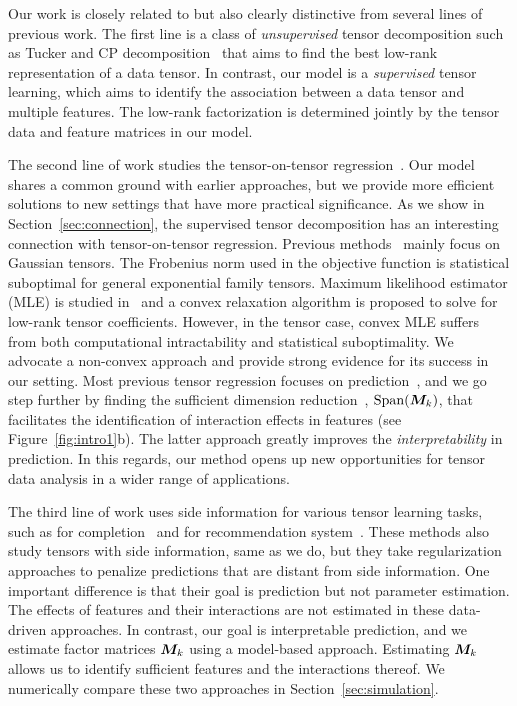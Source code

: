\documentclass[12pt]{article}
\theoremstyle{definition}
\theoremstyle{definition}
\begin{document}
Our work is closely related to but also clearly distinctive from several lines of previous work. The first line is a class of \textit{unsupervised} tensor decomposition such as Tucker and CP decomposition~\citep{de2000multilinear, kolda2009tensor, hong2020generalized} that aims to find the best low-rank representation of a data tensor. In contrast, our model is a \textit{supervised} tensor learning, which aims to identify the association between a data tensor and multiple features. The low-rank factorization is determined jointly by the tensor data and feature matrices in our model.

The second line of work studies the tensor-on-tensor regression~\citep{raskutti2019convex, lock2018tensor, gahrooei2020multiple}. Our model shares a common ground with earlier approaches, but we provide more efficient solutions to new settings that have more practical significance. As we show in Section~\ref{sec:connection}, the supervised tensor decomposition has an interesting connection with tensor-on-tensor regression. Previous methods~\citep{gahrooei2020multiple,lock2018tensor} mainly focus on Gaussian tensors. The Frobenius norm used in the objective function is statistical suboptimal for general exponential family tensors. Maximum likelihood estimator (MLE) is studied in~\citep{raskutti2019convex} and a convex relaxation algorithm is proposed to solve for low-rank tensor coefficients. However, in the tensor case, convex MLE suffers from both computational intractability and statistical suboptimality. We advocate a non-convex approach and provide strong evidence for its success in our setting. Most previous tensor regression focuses on prediction~\citep{lock2018tensor,raskutti2019convex,gahrooei2020multiple}, and we go step further by finding the sufficient dimension reduction~\citep{adragni2009sufficient}, $\textup{Span}(\bm M_k)$, that facilitates the identification of interaction effects in features (see Figure~\ref{fig:intro1}b). The latter approach greatly improves the \emph{interpretability} in prediction. In this regards, our method opens up new opportunities for tensor data analysis in a wider range of applications. 

The third line of work uses side information for various tensor learning tasks, such as for completion~\citep{narita2012tensor,cao2016semi} and for recommendation system~\citep{ioannidis2019coupled,farias2019learning}. These methods also study tensors with side information, same as we do, but they take regularization approaches to penalize predictions that are distant from side information. One important difference is that their goal is prediction but not parameter estimation. The effects of features and their interactions are not estimated in these data-driven approaches. In contrast, our goal is interpretable prediction, and we estimate factor matrices $\bm M_k$ using a model-based approach. Estimating $\bm M_k$ allows us to identify sufficient features and the interactions thereof. We numerically compare these two approaches in Section~\ref{sec:simulation}.
\end{document}
